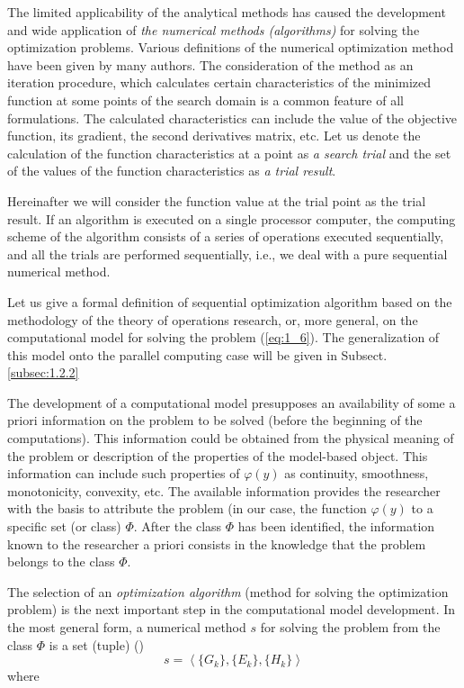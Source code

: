The limited applicability of the analytical methods has caused the development and wide application of \textit {the numerical methods (algorithms)} for solving the optimization problems. Various definitions of the numerical optimization method have been given by many authors. The consideration of the method as an iteration procedure, which calculates certain characteristics of the minimized function at some points of the search domain is a common feature of all formulations. The calculated characteristics can include the value of the objective function, its gradient, the second derivatives matrix, etc. Let us denote the calculation of the function characteristics at a point as \textit {a search trial} and the set of the values of the function characteristics as \textit {a trial result}.

Hereinafter we will consider the function value at the trial point as the trial result. If an algorithm is executed on a single processor computer, the computing scheme of the algorithm consists of a series of operations executed sequentially, and all the trials are performed sequentially, i.e., we deal with a pure sequential numerical method. 

Let us give a formal definition of sequential optimization algorithm based on the methodology of the theory of operations research, or, more general, on the computational model for solving the problem (\ref{eq:1_6}). The generalization of this model onto the parallel computing case will be given in Subsect. \ref{subsec:1.2.2}

The development of a computational model presupposes an availability of some a priori information on the problem to be solved (before the beginning of the computations). This information could be obtained from the physical meaning of the problem or description of the properties of the model-based object. This information can include such properties of $\varphi(y)$ as continuity, smoothness, monotonicity, convexity, etc. The available information provides the researcher with the basis to attribute the problem (in our case, the function $\varphi(y)$ to a specific set (or class) $\Phi$. After the class $\Phi$ has been identified, the information known to the researcher a priori consists in the knowledge that the problem belongs to the class $\Phi$.

The selection of an \textit {optimization algorithm} (method for solving  the optimization problem) is the next important step in the computational model development. In the most general form, a numerical method $s$ for solving the problem from the class $\Phi$ is a set  (tuple) (\cite{1_StrMonRus})
\begin{equation}
\label{eq:1_11}
s=\left\langle \{G_k\},\{E_k\},\{H_k\}\right\rangle
\end{equation}
where 


